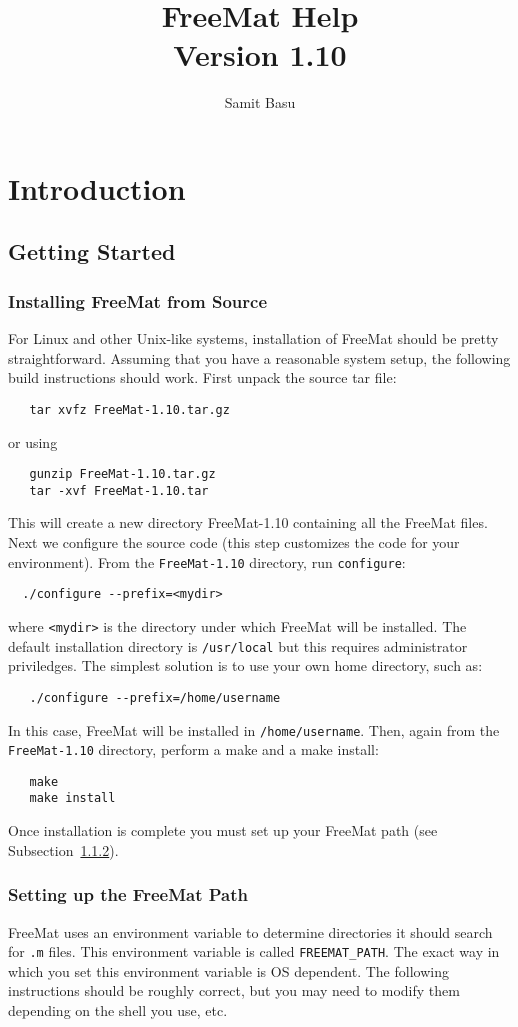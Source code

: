 \documentclass{book}
\title{FreeMat Help\\Version 1.10}
\author{Samit Basu}
\begin{document}
\maketitle
\tableofcontents
\chapter{Introduction}
\section{Getting Started}
\subsection{Installing FreeMat from Source}
For Linux and other Unix-like systems, installation of FreeMat should be pretty straightforward.  Assuming that you have a reasonable system setup, the following build instructions should work.  First unpack the source tar file:
\begin{verbatim}
   tar xvfz FreeMat-1.10.tar.gz
\end{verbatim}
or using
\begin{verbatim}
   gunzip FreeMat-1.10.tar.gz
   tar -xvf FreeMat-1.10.tar
\end{verbatim}
This will create a new directory FreeMat-1.10 containing all the FreeMat files.  Next we configure the source code (this step customizes the code for your environment).  From the \verb|FreeMat-1.10| directory, run \verb|configure|:
\begin{verbatim}
  ./configure --prefix=<mydir>
\end{verbatim}
where \verb|<mydir>| is the directory under which FreeMat will be installed. The default installation directory is \verb|/usr/local| but this requires administrator priviledges. The simplest solution is to use your own home directory, such as:
\begin{verbatim}
   ./configure --prefix=/home/username
\end{verbatim}
In this case, FreeMat will be installed in \verb|/home/username|.
Then, again from the \verb|FreeMat-1.10| directory, perform a make and a make install:
\begin{verbatim}
   make
   make install
\end{verbatim}
Once installation is complete you must set up your FreeMat path (see Subsection~\ref{sec:path}).

\subsection{Setting up the FreeMat Path} \label{sec:path}
FreeMat uses an environment variable to determine directories it should search for \verb|.m| files.  This environment variable is called \verb|FREEMAT_PATH|.  The exact way in which you set this environment variable is OS dependent.  The following instructions should be roughly correct, but you may need to modify them depending on the shell you use, etc.
\end{document}
